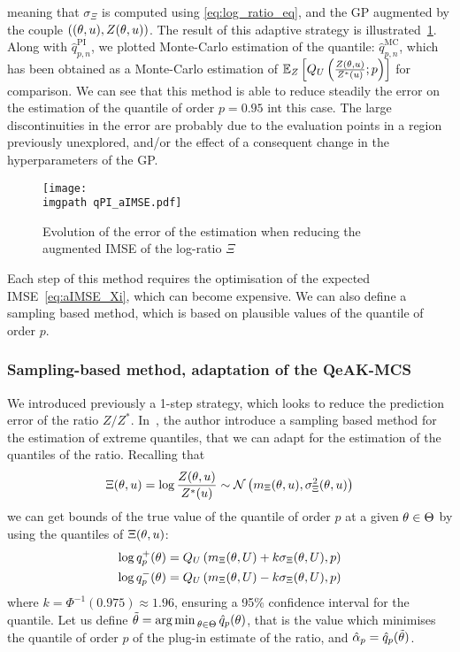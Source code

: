 \documentclass[../../Main_ManuscritThese.tex]{subfiles}
\newcommand\imgpath{/home/victor/acadwriting/Manuscrit/Text/Chapter4/img/}
\begin{document}
meaning that $\sigma_{\Xi}$ is computed using \cref{eq:log_ratio_eq},
and the GP augmented by the couple
$\left((\theta, u), Z(\theta, u)\right)$.  The result of this adaptive
strategy is illustrated~\cref{fig:qPI_aIMSE}. Along with
$\hat{q}_{p,n}^{\mathrm{PI}}$, we plotted Monte-Carlo estimation of
the quantile: $\hat{q}_{p,n}^{\mathrm{MC}}$, which has been obtained
as a Monte-Carlo estimation of
$\mathbb{E}_{Z}\left[Q_{U}\left(\frac{Z(\theta,
      u)}{Z^*(u)};p\right)\right]$ for comparison.  We can see
that this method is able to reduce steadily the error on the
estimation of the quantile of order $p=0.95$ int this case. The large
discontinuities in the error are probably due to the evaluation points
in a region previously unexplored, and/or the effect of a consequent
change in the hyperparameters of the GP.
\begin{figure}[ht]
  \centering
  \texttt{[image: \\imgpath qPI\_aIMSE.pdf]}
  \caption[Error of the estimation when reducing the augmented ISME of $\Xi$]{\label{fig:qPI_aIMSE} Evolution of the error of the estimation when reducing the augmented IMSE of the log-ratio $\Xi$}
\end{figure}

Each step of this method requires the optimisation of the expected
IMSE~\cref{eq:aIMSE_Xi}, which can become expensive. We can also
define a sampling based method, which is based on plausible values of
the quantile of order $p$.

\subsubsection{Sampling-based method, adaptation of the QeAK-MCS}
\label{ssec:quantile_qeakmcs}
We introduced previously a 1-step strategy, which looks to reduce the
prediction error of the ratio
$Z/Z^*$. In~\cite{razaaly_rare_2019,razaaly_quantile-based_2020}, the
author introduce a sampling based method for the estimation of extreme
quantiles, that we can adapt for the estimation of the quantiles of
the ratio.  Recalling that
\begin{equation}
  \Xi(\theta, u) = \log\frac{Z(\theta, u)}{Z^*(u)} \sim \mathcal{N}\left(m_{\Xi}(\theta, u),\sigma^2_{\Xi}(\theta, u)\right)
\end{equation}
we can get bounds of the true value of the quantile of order $p$ at a
given $\theta\in\Theta$ by using the quantiles of $\Xi(\theta, u)$:
\begin{align}
  \log q_p^{+}(\theta) = Q_{U}\left(m_{\Xi}(\theta, U) + k \sigma_{\Xi}(\theta, U), p\right) \\
  \log q_p^{-}(\theta) = Q_{U}\left(m_{\Xi}(\theta, U) - k \sigma_{\Xi}(\theta, U), p\right)
\end{align}
where $k = \Phi^{-1}(0.975)\approx 1.96$, ensuring a 95\% confidence
interval for the quantile.  Let us define
$\tilde{\theta}=\operatorname*{arg\,min \,}_{\theta \in\Theta} \hat{q}_p(\theta)$, that is the
value which minimises the quantile of order $p$ of the plug-in
estimate of the ratio, and $\hat{\alpha}_p = \hat{q}_p(\tilde{\theta})$.
\end{document}

